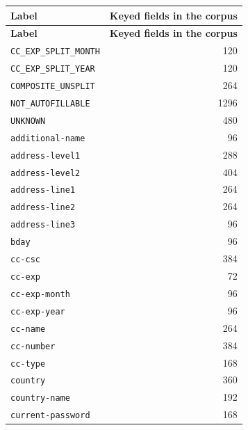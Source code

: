 \begin{longtable}{lr}
\toprule
\textbf{Label} & \textbf{Keyed fields in the corpus} \\
\midrule
\endfirsthead
\toprule
\textbf{Label} & \textbf{Keyed fields in the corpus} \\
\midrule
\endhead
\bottomrule
\endfoot
\texttt{CC\_EXP\_SPLIT\_MONTH} & 120 \\  %
\texttt{CC\_EXP\_SPLIT\_YEAR} & 120 \\  %
\texttt{COMPOSITE\_UNSPLIT} & 264 \\  %
\texttt{NOT\_AUTOFILLABLE} & 1296 \\  %
\texttt{UNKNOWN} & 480 \\  %
\texttt{additional-name} & 96 \\  %
\texttt{address-level1} & 288 \\  %
\texttt{address-level2} & 404 \\  %
\texttt{address-line1} & 264 \\  %
\texttt{address-line2} & 264 \\  %
\texttt{address-line3} & 96 \\  %
\texttt{bday} & 96 \\  %
\texttt{cc-csc} & 384 \\  %
\texttt{cc-exp} & 72 \\  %
\texttt{cc-exp-month} & 96 \\  %
\texttt{cc-exp-year} & 96 \\  %
\texttt{cc-name} & 264 \\  %
\texttt{cc-number} & 384 \\  %
\texttt{cc-type} & 168 \\  %
\texttt{country} & 360 \\  %
\texttt{country-name} & 192 \\  %
\texttt{current-password} & 168 \\  %

\end{longtable}
